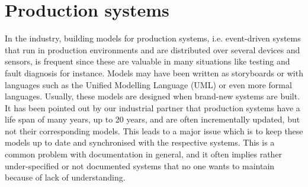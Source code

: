 \section{Production systems}
\label{sec:modelinf:prodsystems}

In the industry, building models for production systems, i.e.
event-driven systems that run in production environments and are
distributed over several devices and sensors, is frequent since
these are valuable in many situations like testing and fault
diagnosis for instance. Models may have been written as
storyboards or with languages such as the Unified Modelling
Language (UML) or even more formal languages. Usually, these
models are designed when brand-new systems are built. It has been
pointed out by our industrial partner that production systems
have a life span of many years, up to 20 years, and are often
incrementally updated, but not their corresponding models. This
leads to a major issue which is to keep these models up to date
and synchronised with the respective systems. This is a common
problem with documentation in general, and it often implies
rather under-specified or not documented systems that no one
wants to maintain because of lack of understanding.



